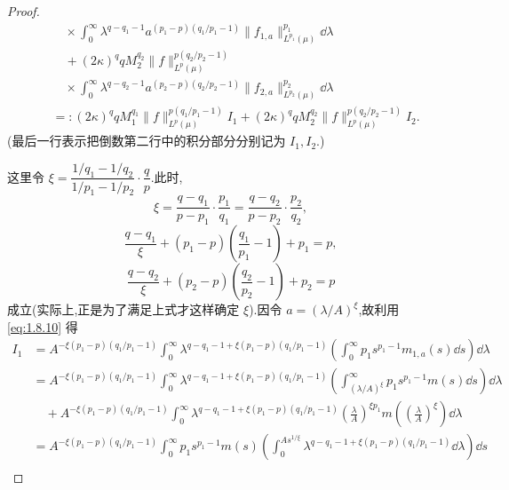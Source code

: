 \begin{proof}
\begin{align*}
& \quad \times \displaystyle\int_{0}^{\infty}\lambda^{q-q_{1}-1}a^{(p_{1}-p)(q_{1}/p_{1}-1)}\| f_{1,a} \|_{L^{p_{1}}(\mu)}^{p_{1}}\dd \lambda \\
& \quad + (2\kappa)^{q}qM_{2}^{q_{2}}\| f \|_{L^{p}(\mu)}^{p(q_{2}/p_{2}-1)} \\
& \quad \times \displaystyle\int_{0}^{\infty}\lambda^{q-q_{2}-1}a^{(p_{2}-p)(q_{2}/p_{2}-1)}\| f_{2,a} \|_{L^{p_{2}}(\mu)}^{p_{2}}\dd \lambda \\
& =: (2\kappa)^{q}qM_{1}^{q_{1}}\| f \|_{L^{p}(\mu)}^{p(q_{1}/p_{1}-1)}I_{1} + (2\kappa)^{q}qM_{2}^{q_{2}}\| f \|_{L^{p}(\mu)}^{p(q_{2}/p_{2}-1)}I_{2}.
\end{align*}
(最后一行表示把倒数第二行中的积分部分分别记为 $I_{1}, I_{2}$.)

这里令 $\xi = \dfrac{1/q_{1} - 1/q_{2}}{1/p_{1} - 1/p_{2}}\cdot\dfrac{q}{p}$.此时,
\begin{equation}\tag{1.8.11}
\xi = \frac{q - q_{1}}{p - p_{1}}\cdot\frac{p_{1}}{q_{1}} = \frac{q - q_{2}}{p - p_{2}}\cdot\frac{p_{2}}{q_{2}},
\label{eq:1.8.11}\end{equation}
\begin{equation}\tag{1.8.12}
\frac{q - q_{1}}{\xi} + (p_{1} - p)\left(\frac{q_{1}}{p_{1}} - 1\right) + p_{1} = p,
\label{eq:1.8.12}\end{equation}
\begin{equation}\tag{1.8.13}
\frac{q - q_{2}}{\xi} + (p_{2} - p)\left(\frac{q_{2}}{p_{2}} - 1\right) + p_{2} = p
\label{eq:1.8.13}\end{equation}
成立(实际上,正是为了满足上式才这样确定 $\xi$).因令 $a = (\lambda/A)^{\xi}$,故利用 \eqref{eq:1.8.10} 得
\begin{align*}
I_{1}&= A^{-\xi(p_{1}-p)(q_{1}/p_{1}-1)}\displaystyle\int_{0}^{\infty}\lambda^{q-q_{1}-1+\xi(p_{1}-p)(q_{1}/p_{1}-1)}\left(\int_{0}^{\infty}p_{1}s^{p_{1}-1}m_{1,a}(s)\dd s\right)\dd \lambda  \\
&= A^{-\xi(p_{1}-p)(q_{1}/p_{1}-1)}\displaystyle\int_{0}^{\infty}\lambda^{q-q_{1}-1+\xi(p_{1}-p)(q_{1}/p_{1}-1)}\left(\int_{(\lambda/A)^{\xi}}^{\infty}p_{1}s^{p_{1}-1}m(s)\dd s\right)\dd \lambda \\
&\quad + A^{-\xi(p_{1}-p)(q_{1}/p_{1}-1)}\displaystyle\int_{0}^{\infty}\lambda^{q-q_{1}-1+\xi(p_{1}-p)(q_{1}/p_{1}-1)}\left(\frac{\lambda}{A}\right)^{\xi p_{1}}m\left(\left(\frac{\lambda}{A}\right)^{\xi}\right)\dd \lambda \\
&= A^{-\xi(p_{1}-p)(q_{1}/p_{1}-1)}\displaystyle\int_{0}^{\infty}p_{1}s^{p_{1}-1}m(s)\left(\int_{0}^{As^{1/\xi}}\lambda^{q-q_{1}-1+\xi(p_{1}-p)(q_{1}/p_{1}-1)}\dd \lambda\right)\dd s \\

\end{align*}
\end{proof}
